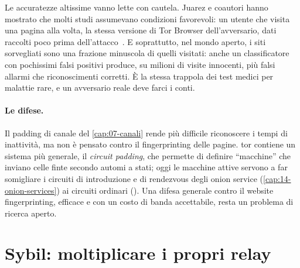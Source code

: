 \begin{approfondimento}
Le accuratezze altissime vanno lette con cautela. Juarez e coautori hanno mostrato che molti studi assumevano condizioni favorevoli: un utente che visita una pagina alla volta, la stessa versione di Tor Browser dell'avversario, dati raccolti poco prima dell'attacco~\cite{juarez2014critical}. E soprattutto, nel mondo aperto, i siti sorvegliati sono una frazione minuscola di quelli visitati: anche un classificatore con pochissimi falsi positivi produce, su milioni di visite innocenti, più falsi allarmi che riconoscimenti corretti. È la stessa trappola dei test medici per malattie rare, e un avversario reale deve farci i conti.
\end{approfondimento}

\paragraph{Le difese.} Il padding di canale del \cref{cap:07-canali} rende più difficile riconoscere i tempi di inattività, ma non è pensato contro il fingerprinting delle pagine. tor contiene un sistema più generale, il \emph{circuit padding}, che permette di definire \enquote{macchine} che inviano celle finte secondo automi a stati; oggi le macchine attive servono a far somigliare i circuiti di introduzione e di rendezvous degli onion service (\cref{cap:14-onion-services}) ai circuiti ordinari (). Una difesa generale contro il website fingerprinting, efficace e con un costo di banda accettabile, resta un problema di ricerca aperto.

\section{Sybil: moltiplicare i propri relay}\label{sec:att-sybil}

